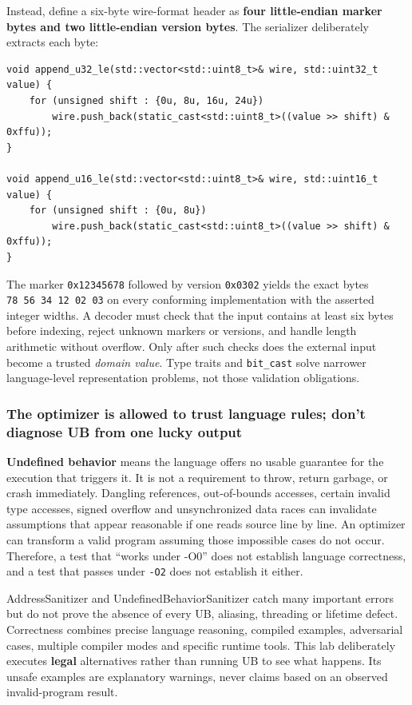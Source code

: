 Instead, define a six-byte wire-format header as \textbf{four little-endian marker bytes and two little-endian version bytes}. The serializer deliberately extracts each byte:

\begin{verbatim}
void append_u32_le(std::vector<std::uint8_t>& wire, std::uint32_t value) {
    for (unsigned shift : {0u, 8u, 16u, 24u})
        wire.push_back(static_cast<std::uint8_t>((value >> shift) & 0xffu));
}

void append_u16_le(std::vector<std::uint8_t>& wire, std::uint16_t value) {
    for (unsigned shift : {0u, 8u})
        wire.push_back(static_cast<std::uint8_t>((value >> shift) & 0xffu));
}
\end{verbatim}

The marker \texttt{0x12345678} followed by version \texttt{0x0302} yields the exact bytes \texttt{78\ 56\ 34\ 12\ 02\ 03} on every conforming implementation with the asserted integer widths. A decoder must check that the input contains at least six bytes before indexing, reject unknown markers or versions, and handle length arithmetic without overflow. Only after such checks does the external input become a trusted \emph{domain value}. Type traits and \texttt{bit\_cast} solve narrower language-level representation problems, not those validation obligations.

\subsubsection{The optimizer is allowed to trust language rules; don't diagnose UB from one lucky output}\label{the-optimizer-is-allowed-to-trust-language-rules-dont-diagnose-ub-from-one-lucky-output}

\textbf{Undefined behavior} means the language offers no usable guarantee for the execution that triggers it. It is not a requirement to throw, return garbage, or crash immediately. Dangling references, out-of-bounds accesses, certain invalid type accesses, signed overflow and unsynchronized data races can invalidate assumptions that appear reasonable if one reads source line by line. An optimizer can transform a valid program assuming those impossible cases do not occur. Therefore, a test that ``works under -O0'' does not establish language correctness, and a test that passes under \texttt{-O2} does not establish it either.

AddressSanitizer and UndefinedBehaviorSanitizer catch many important errors but do not prove the absence of every UB, aliasing, threading or lifetime defect. Correctness combines precise language reasoning, compiled examples, adversarial cases, multiple compiler modes and specific runtime tools. This lab deliberately executes \textbf{legal} alternatives rather than running UB to see what happens. Its unsafe examples are explanatory warnings, never claims based on an observed invalid-program result.

